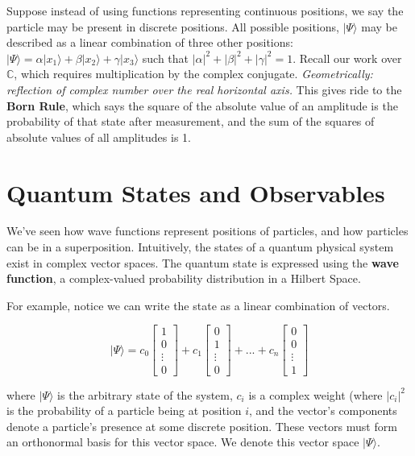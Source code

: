 \documentclass[letterpaper, 10 pt, conference]{ieeeconf}
\begin{document}
Suppose instead of using functions representing continuous positions, we say the particle may be present in discrete positions.  All possible positions, \(|\Psi\rangle\) may be described as a linear combination of three other positions: \( |\Psi\rangle = \alpha|x_1\rangle + \beta|x_2\rangle + \gamma|x_3\rangle \) such that \(|\alpha|^2 + |\beta|^2 + |\gamma|^2 = 1\).  Recall our work over \( \mathbb{C} \), which requires multiplication by the complex conjugate.  \textit{Geometrically: reflection of complex number over the real horizontal axis.}  This gives ride to the \textbf{Born Rule}, which says the square of the absolute value of an amplitude is the probability of that state after measurement, and the sum of the squares of absolute values of all amplitudes is 1.

\section{Quantum States and Observables}

We've seen how wave functions represent positions of particles, and how particles can be in a superposition.  Intuitively, the states of a quantum physical system exist in complex vector spaces.  The quantum state is expressed using the \textbf{wave function}, a complex-valued probability distribution in a Hilbert Space.

For example, notice we can write the state as a linear combination of vectors.

\[
|\Psi\rangle = 
c_0 \begin{bmatrix}1 \\ 0 \\ \vdots \\ 0\end{bmatrix} + 
c_1 \begin{bmatrix}0 \\ 1 \\ \vdots \\ 0\end{bmatrix} + ... +
c_n \begin{bmatrix}0 \\ 0 \\ \vdots \\ 1\end{bmatrix}
\]

where \( |\Psi\rangle \) is the arbitrary state of the system, \(c_i\) is a complex weight (where \(|c_i|^2\) is the probability of a particle being at position \(i\), and the vector's components denote a particle's presence at some discrete position.  These vectors must form an orthonormal basis for this vector space.  We denote this vector space \( |\Psi\rangle \). \\
\end{document}
